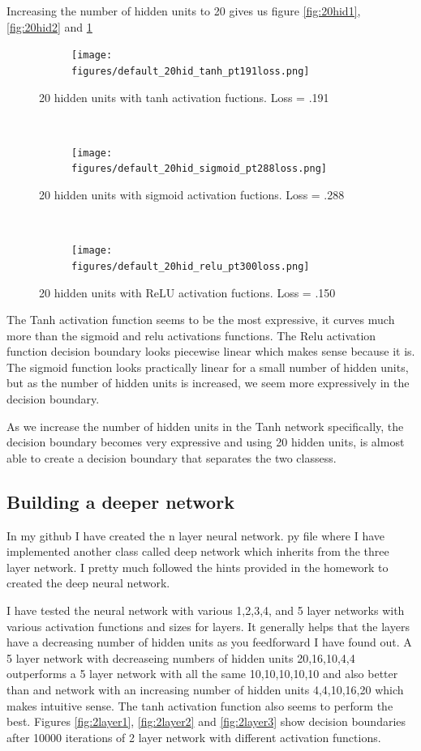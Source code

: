 \documentclass[]{article}
\begin{document}
Increasing the number of hidden units to 20 gives us figure \ref{fig:20hid1}, \ref{fig:20hid2} and  \ref{fig:20hid3}

\begin{figure}[ht]
    \centering
    \begin{subfigure}
        \centering
        \texttt{[image: figures/default\_20hid\_tanh\_pt191loss.png]}
    \end{subfigure}%
    \caption{20 hidden units with tanh activation fuctions. Loss = .191}
 \label{fig:20hid1}
    ~ 
    \begin{subfigure}
        \centering
        \texttt{[image: figures/default\_20hid\_sigmoid\_pt288loss.png]}
    \end{subfigure}
    \caption{20 hidden units with sigmoid activation fuctions. Loss = .288}
 \label{fig:20hid2}
    ~ 
    \begin{subfigure}
        \centering
        \texttt{[image: figures/default\_20hid\_relu\_pt300loss.png]}
    \end{subfigure}
    \caption{20 hidden units with ReLU activation fuctions. Loss = .150}
 \label{fig:20hid3}
\end{figure}

The Tanh activation function seems to be the most expressive, it curves much more than the sigmoid and relu activations functions. The Relu activation function decision boundary looks piecewise linear which makes sense because it is. The sigmoid function looks practically linear for a small number of hidden units, but as the number of hidden units is increased, we seem more expressively in the decision boundary. 

As we increase the number of hidden units in the Tanh network specifically, the decision boundary becomes very expressive and using 20 hidden units, is almost able to create a decision boundary that separates the two classess. 

\subsection{Building a deeper network}
In my github I have created the n layer neural network. py file where I have implemented another class called deep network which inherits from the three layer network. I pretty much followed the hints provided in the homework to created the deep neural network. 

I have tested the neural network with various 1,2,3,4, and 5 layer networks with various activation functions and sizes for layers. It generally helps that the layers have a decreasing number of hidden units as you feedforward I have found out. A 5 layer network with decreaseing numbers of hidden units 20,16,10,4,4 outperforms a 5 layer network with all the same 10,10,10,10,10 and also better than and network with an increasing number of hidden units 4,4,10,16,20 which makes intuitive sense. The tanh activation function also seems to perform the best. Figures \ref{fig:2layer1}, \ref{fig:2layer2} and \ref{fig:2layer3} show decision boundaries after 10000 iterations of 2 layer network with different activation functions. 
\end{document}
